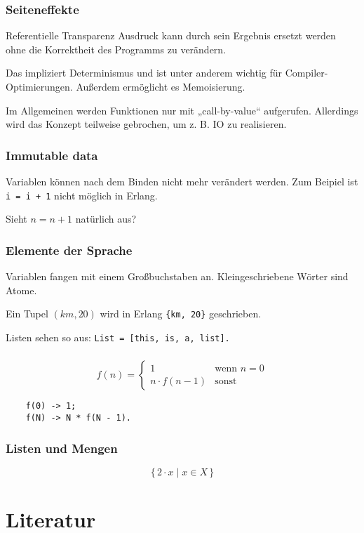 \documentclass[compress]{beamer}
\begin{document}
\begin{frame}
  \frametitle{Seiteneffekte}

  \begin{block}{Referentielle Transparenz}
    Ausdruck kann durch sein Ergebnis ersetzt werden ohne die
    Korrektheit des Programms zu verändern.
  \end{block}
  Das impliziert Determinismus und ist unter anderem wichtig für
  Compiler-Optimierungen.  Außerdem ermöglicht es Memoisierung.

  \bigskip Im Allgemeinen werden Funktionen nur mit „call-by-value“
  aufgerufen.  Allerdings wird das Konzept teilweise gebrochen, um
  z. B. IO zu realisieren.
\end{frame}

\begin{frame}
  \frametitle{Immutable data}

  Variablen können nach dem Binden nicht mehr verändert werden. Zum
  Beipiel ist \lstinline{i = i + 1} nicht möglich in Erlang.

  \pause
  \bigskip Sieht $n=n+1$ natürlich aus?

\end{frame}

\begin{frame}[fragile]
  \frametitle{Elemente der Sprache}

  Variablen fangen mit einem Großbuchstaben an.  Kleingeschriebene
  Wörter sind {\Medium Atome}.

  Ein Tupel $(km, 20)$ wird in Erlang \verb|{km, 20}| geschrieben.

  Listen sehen so aus: \quad\verb|List = [this, is, a, list].|
\end{frame}

\begin{frame}[fragile]
  \frametitle{}
  $$
  f(n) =
  \begin{cases}
    1             &\textrm{wenn } n = 0 \\
    n \cdot f(n - 1) & \textrm{sonst}
  \end{cases}
  $$
  \vfill

  \begin{lstlisting}
    f(0) -> 1;
    f(N) -> N * f(N - 1).
  \end{lstlisting}
\end{frame}

\begin{frame}[fragile]
  \frametitle{Listen und Mengen}
  $$ \{\,2 \cdot x \mid x \in X\,\}$$


\end{frame}

\section{Literatur}
\label{sec:literatur}


\end{document}
